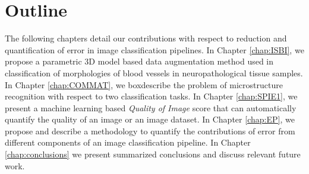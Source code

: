 \section{Outline}
The following chapters detail our contributions with respect to reduction and quantification of error in image classification pipelines.
In Chapter \ref{chap:ISBI}, we propose a parametric 3D model based data augmentation method used in classification of morphologies of blood vessels in neuropathological tissue samples. 
In Chapter \ref{chap:COMMAT}, we boxdescribe the problem of microstructure recognition with respect to two classification tasks. 
In Chapter \ref{chap:SPIE1}, we present a machine learning based \textit{Quality of Image} score that can automatically quantify the quality of an image or an image dataset.
In Chapter \ref{chap:EP}, we propose and describe a methodology to quantify the contributions of error from different components of an image classification pipeline. 
In Chapter \ref{chap:conclusions} we present summarized conclusions and discuss relevant future
work. 